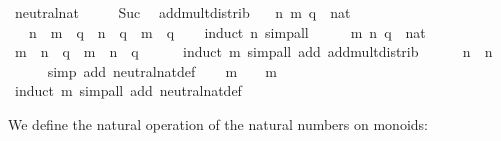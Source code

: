 \begin{isabellebody}
\isanewline
{}\isamarkupfalse%
\ neutral{\isacharunderscore}nat\ \isanewline
\ \ {\isachardoublequoteopen}{\isasymone}\ {\isacharequal}\ Suc\ {}{\isachardoublequoteclose}\isanewline
\isanewline
{}\isamarkupfalse%
\ add{\isacharunderscore}mult{\isacharunderscore}distrib{\isacharcolon}\isanewline
\ \ \ n\ m\ q\ {\isacharcolon}{\isacharcolon}\ nat\isanewline
\ \ \ {\isachardoublequoteopen}{\isacharparenleft}n\ {\isacharplus}\ m{\isacharparenright}\ {\isasymotimes}\ q\ {\isacharequal}\ n\ {\isasymotimes}\ q\ {\isacharplus}\ m\ {\isasymotimes}\ q{\isachardoublequoteclose}\isanewline
\ \ \isamarkupfalse%
\ {\isacharparenleft}induct\ n{\isacharparenright}\ simp{\isacharunderscore}all\isanewline
\isanewline
{}\isamarkupfalse%
\ \isamarkupfalse%
\isanewline
\ \ \isamarkupfalse%
\ m\ n\ q\ {\isacharcolon}{\isacharcolon}\ nat\isanewline
\ \ \isamarkupfalse%
\ {\isachardoublequoteopen}m\ {\isasymotimes}\ n\ {\isasymotimes}\ q\ {\isacharequal}\ m\ {\isasymotimes}\ {\isacharparenleft}n\ {\isasymotimes}\ q{\isacharparenright}{\isachardoublequoteclose}\isanewline
\ \ \ \ \isamarkupfalse%
\ {\isacharparenleft}induct\ m{\isacharparenright}\ {\isacharparenleft}simp{\isacharunderscore}all\ add{\isacharcolon}\ add{\isacharunderscore}mult{\isacharunderscore}distrib{\isacharparenright}\isanewline
\ \ \isamarkupfalse%
\ {\isachardoublequoteopen}{\isasymone}\ {\isasymotimes}\ n\ {\isacharequal}\ n{\isachardoublequoteclose}\isanewline
\ \ \ \ \isamarkupfalse%
\ {\isacharparenleft}simp\ add{\isacharcolon}\ neutral{\isacharunderscore}nat{\isacharunderscore}def{\isacharparenright}\isanewline
\ \ \isamarkupfalse%
\ {\isachardoublequoteopen}m\ {\isasymotimes}\ {\isasymone}\ {\isacharequal}\ m{\isachardoublequoteclose}\isanewline
\ \ \ \ \isamarkupfalse%
\ {\isacharparenleft}induct\ m{\isacharparenright}\ {\isacharparenleft}simp{\isacharunderscore}all\ add{\isacharcolon}\ neutral{\isacharunderscore}nat{\isacharunderscore}def{\isacharparenright}\isanewline
{}\isamarkupfalse%
\isanewline
\isanewline
{}\isamarkupfalse%
%
\endisatagquote
{\isafoldquote}%
%
\isadelimquote
%
\endisadelimquote
%
\begin{isamarkuptext}%
\noindent We define the natural operation of the natural numbers
  on monoids:%
\end{isamarkuptext}%
\isamarkuptrue%

\end{isabellebody}
